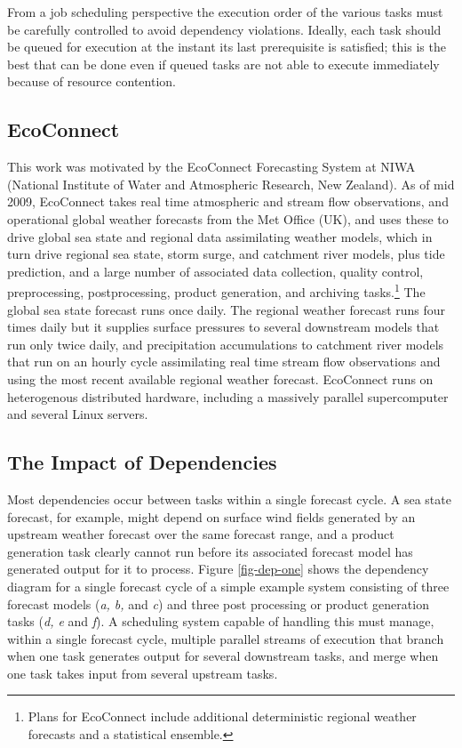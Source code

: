\documentclass[11pt,a4paper]{article}
\begin{document}
From a job scheduling perspective the execution order of the various
tasks must be carefully controlled to avoid dependency violations.
Ideally, each task should be queued for execution at the instant its
last prerequisite is satisfied; this is the best that can be done even
if queued tasks are not able to execute immediately because of resource
contention.


\subsection{EcoConnect}

This work was motivated by the EcoConnect Forecasting System at NIWA
(National Institute of Water and Atmospheric Research, New Zealand).  As
of mid 2009, EcoConnect takes real time atmospheric and stream flow
observations, and operational global weather forecasts from the Met
Office (UK), and uses these to drive global sea state and regional data
assimilating weather models, which in turn drive regional sea state,
storm surge, and catchment river models, plus tide prediction, and a
large number of associated data collection, quality control,
preprocessing, postprocessing, product generation, and archiving
tasks.\footnote{Plans for EcoConnect include additional deterministic
regional weather forecasts and a statistical ensemble.} The global sea
state forecast runs once daily.  The regional weather forecast runs four
times daily but it supplies surface pressures to several downstream
models that run only twice daily, and precipitation accumulations to
catchment river models that run on an hourly cycle assimilating real
time stream flow observations and using the most recent available
regional weather forecast.  EcoConnect runs on heterogenous distributed
hardware, including a massively parallel supercomputer and several Linux
servers. 

\subsection{The Impact of Dependencies}

Most dependencies occur between tasks within a single forecast cycle. A
sea state forecast, for example, might depend on surface wind fields
generated by an upstream weather forecast over the same forecast range,
and a product generation task clearly cannot run before its associated
forecast model has generated output for it to process. Figure
\ref{fig-dep-one} shows the dependency diagram for a single forecast
cycle of a simple example system consisting of three forecast models
({\em a, b,} and {\em c}) and three post processing or product
generation tasks ({\em d, e} and {\em f}).  A scheduling system capable
of handling this must manage, within a single forecast cycle, multiple
parallel streams of execution that branch when one task generates output
for several downstream tasks, and merge when one task takes input from
several upstream tasks. 
\end{document}

